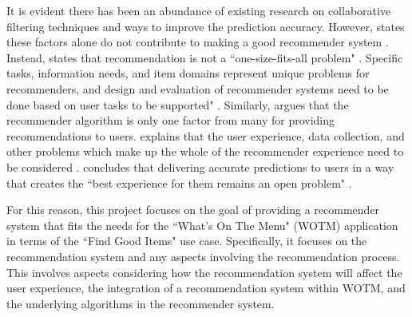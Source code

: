 It is evident there has been an abundance of existing research on collaborative filtering techniques and ways to improve the prediction accuracy. However, \citeauthor{schafer2007collaborative} \cite{interface} states these factors alone do not contribute to making a good recommender system \cite{schafer2007collaborative}. Instead, \citeauthor{schafer2007collaborative} \cite{interface} states that recommendation is not a ``one-size-fits-all problem"  \cite{schafer2007collaborative}. Specific tasks, information needs, and item domains represent unique problems for recommenders, and design and evaluation of recommender systems need to be done based on user tasks to be supported" \cite{schafer2007collaborative}. Similarly, \citeauthor{martin2009recsys} \cite{martin2009recsys} argues that the recommender algorithm is only one factor from many for providing recommendations to users. \citeauthor{martin2009recsys}  \cite{martin2009recsys} explains that the user experience, data collection, and other problems which make up the whole of the recommender experience need to be considered \cite{schafer2007collaborative, martin2009recsys}. \citeauthor{interface} \cite{interface} concludes that delivering accurate predictions to users in a way that creates the ``best experience for them remains an open problem" \cite{interface}. 

For this reason, this project focuses on the goal of providing a recommender system that fits the needs for the ``What's On The Menu" (WOTM) application in terms of the ``Find Good Items" use case. Specifically, it focuses on the recommendation system and any aspects involving the recommendation process. This involves aspects considering how the recommendation system will affect the user experience, the integration of a recommendation system within WOTM, and the underlying algorithms in the recommender system. 


